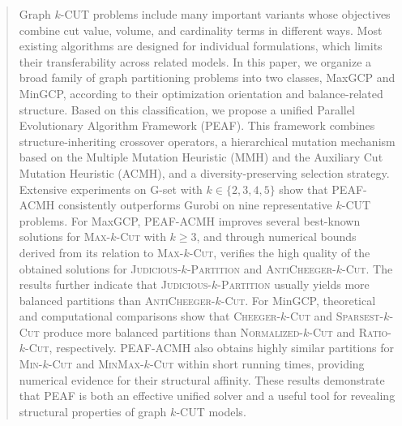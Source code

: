 \documentclass[12pt, a4paper]{article}%
\numberwithin{equation}{section}
\theoremstyle{plain}
\begin{document}
	\begin{abstract}
    Graph $k$-CUT problems include many important variants whose objectives combine
cut value, volume, and cardinality terms in different ways. Most existing algorithms are
designed for individual formulations, which limits their transferability across
related models. In this paper, we organize a broad family of graph partitioning
problems into two classes, MaxGCP and MinGCP, according to their optimization
orientation and balance-related structure. Based on this classification, we propose a unified
Parallel Evolutionary Algorithm Framework (PEAF). This framework combines structure-inheriting crossover operators, a hierarchical
mutation mechanism based on the Multiple Mutation Heuristic (MMH) and the Auxiliary Cut Mutation Heuristic (ACMH), and a diversity-preserving selection
strategy. Extensive experiments on G-set with $k \in \{2,3,4,5\}$ show that
PEAF-ACMH consistently outperforms Gurobi on nine representative $k$-CUT
problems. For MaxGCP, PEAF-ACMH improves several best-known solutions
for \textsc{Max}-$k$-\textsc{Cut} with $k \ge 3$, and through numerical bounds
derived from its relation to \textsc{Max}-$k$-\textsc{Cut}, verifies the high
quality of the obtained solutions for \textsc{Judicious}-$k$-\textsc{Partition}
and \textsc{AntiCheeger}-$k$-\textsc{Cut}. The results further indicate that
\textsc{Judicious}-$k$-\textsc{Partition} usually yields more balanced
partitions than \textsc{AntiCheeger}-$k$-\textsc{Cut}. For MinGCP, theoretical and computational comparisons show that
\textsc{Cheeger}-$k$-\textsc{Cut} and \textsc{Sparsest}-$k$-\textsc{Cut} produce
more balanced partitions than \textsc{Normalized}-$k$-\textsc{Cut} and
\textsc{Ratio}-$k$-\textsc{Cut}, respectively. PEAF-ACMH also obtains highly
similar partitions for \textsc{Min}-$k$-\textsc{Cut} and
\textsc{MinMax}-$k$-\textsc{Cut} within short running times, providing numerical
evidence for their structural affinity. These results demonstrate that PEAF
is both an effective unified solver and a useful tool for revealing structural
properties of graph $k$-CUT models.
		

\end{abstract}
\end{document}
